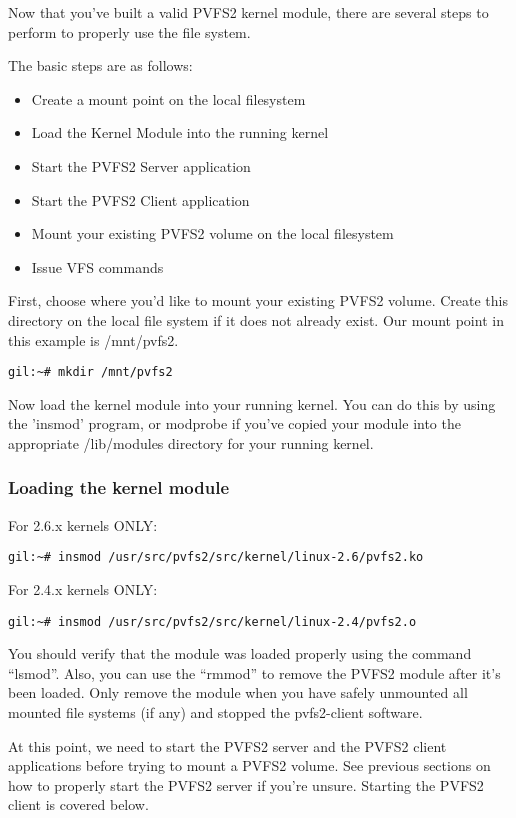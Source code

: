 \documentclass[11pt, letterpaper]{article}
\begin{document}
Now that you've built a valid PVFS2 kernel module, there are several
steps to perform to properly use the file system.

The basic steps are as follows:
\begin{itemize}
\item Create a mount point on the local filesystem
\item Load the Kernel Module into the running kernel
\item Start the PVFS2 Server application
\item Start the PVFS2 Client application
\item Mount your existing PVFS2 volume on the local filesystem
\item Issue VFS commands
\end{itemize}

First, choose where you'd like to mount your existing PVFS2 volume.
Create this directory on the local file system if it does not already
exist.  Our mount point in this example is /mnt/pvfs2.

\begin{verbatim}
gil:~# mkdir /mnt/pvfs2
\end{verbatim}

Now load the kernel module into your running kernel.  You can do this
by using the 'insmod' program, or modprobe if you've copied your
module into the appropriate /lib/modules directory for your running
kernel.

\subsubsection{Loading the kernel module}
For 2.6.x kernels ONLY:
\begin{verbatim}
gil:~# insmod /usr/src/pvfs2/src/kernel/linux-2.6/pvfs2.ko
\end{verbatim}

For 2.4.x kernels ONLY:
\begin{verbatim}
gil:~# insmod /usr/src/pvfs2/src/kernel/linux-2.4/pvfs2.o
\end{verbatim}

You should verify that the module was loaded properly using the
command ``lsmod''.  Also, you can use the ``rmmod'' to remove the
PVFS2 module after it's been loaded.  Only remove the module when you
have safely unmounted all mounted file systems (if any) and stopped
the pvfs2-client software.

At this point, we need to start the PVFS2 server and the PVFS2 client
applications before trying to mount a PVFS2 volume.  See previous
sections on how to properly start the PVFS2 server if you're unsure.
Starting the PVFS2 client is covered below.
\end{document}
